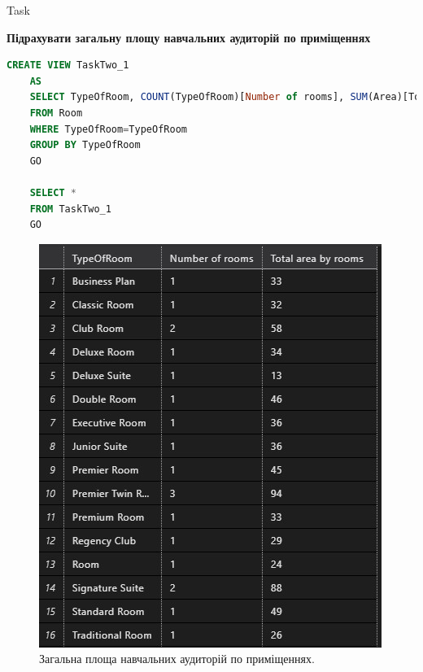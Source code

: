 \documentclass[a4paper,12pt]{article}
\newcommand{\RomanNumeralCaps}[1]{\MakeUppercase{\romannumeral #1}}
\begin{document}
\newpage
	\begin{center}
        \Large{Task \RomanNumeralCaps{2}}
    \end{center}
	\textbf{Підрахувати загальну площу навчальних аудиторій по приміщеннях}
	\begin{lstlisting}[language=SQL]
	CREATE VIEW TaskTwo_1
	AS
	SELECT TypeOfRoom, COUNT(TypeOfRoom)[Number of rooms], SUM(Area)[Total area by rooms]
	FROM Room 
	WHERE TypeOfRoom=TypeOfRoom
	GROUP BY TypeOfRoom
	GO
	
	SELECT *
	FROM TaskTwo_1
	GO
	\end{lstlisting}
	\begin{figure}[h!]
		\begin{minipage}[h]{1\linewidth}
			\centering
			\includegraphics[width=0.7\linewidth]{Prt sc/Figure_2.jpg}  
		\end{minipage}
		\caption{Загальна площа навчальних аудиторій по приміщеннях.}
	\end{figure}
\end{document}
